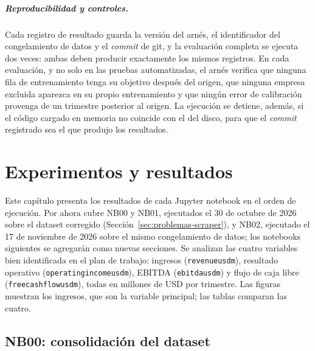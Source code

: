 \documentclass[12pt,letterpaper,oneside]{report}
\renewcommand{\_}{\UnderscoreOriginal\allowbreak}
\begin{document}
\paragraph{Reproducibilidad y controles.} Cada registro de resultado guarda la versión del arnés, el identificador del congelamiento de datos y el \textit{commit} de git, y la evaluación completa se ejecuta dos veces: ambas deben producir exactamente los mismos registros. En cada evaluación, y no solo en las pruebas automatizadas, el arnés verifica que ninguna fila de entrenamiento tenga su objetivo después del origen, que ninguna empresa excluida aparezca en su propio entrenamiento y que ningún error de calibración provenga de un trimestre posterior al origen. La ejecución se detiene, además, si el código cargado en memoria no coincide con el del disco, para que el \textit{commit} registrado sea el que produjo los resultados.

\chapter{Experimentos y resultados}
\label{cap:resultados}

Este capítulo presenta los resultados de cada Jupyter notebook en el orden de ejecución. Por ahora cubre NB00 y NB01, ejecutados el 30 de octubre de 2026 sobre el dataset corregido (Sección~\ref{sec:problemas-scraper}), y NB02, ejecutado el 17 de noviembre de 2026 sobre el mismo congelamiento de datos; los notebooks siguientes se agregarán como nuevas secciones. Se analizan las cuatro variables bien identificada en el plan de trabajo: ingresos (\texttt{revenue\_usd\_m}), resultado operativo (\texttt{operating\_income\_usd\_m}), EBITDA (\texttt{ebitda\_usd\_m}) y flujo de caja libre (\texttt{free\_cash\_flow\_usd\_m}), todas en millones de USD por trimestre. Las figuras muestran los ingresos, que son la variable principal; las tablas comparan las cuatro.

\section{NB00: consolidación del dataset}
\label{sec:res-nb00}
\end{document}
